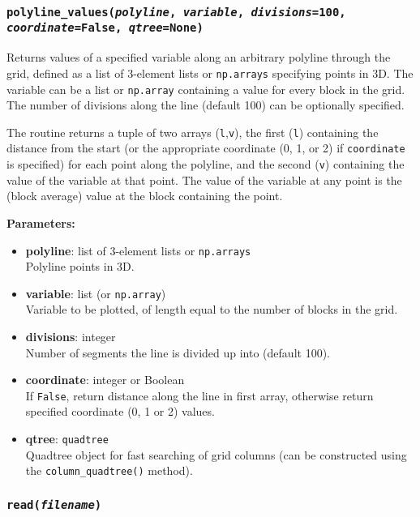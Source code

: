 \subsubsection{\texttt{polyline\_values(\emph{polyline}, \emph{variable}, \emph{divisions}=100, \emph{coordinate}=\texttt{False}, \emph{qtree}=None)}}

Returns values of a specified variable along an arbitrary polyline through the grid, defined as a list of 3-element lists or \texttt{np.arrays} specifying points in 3D.  The variable can be a list or \texttt{np.array} containing a value for every block in the grid.  The number of divisions along the line (default 100) can be optionally specified.

The routine returns a tuple of two arrays (\texttt{l},\texttt{v}), the first (\texttt{l}) containing the distance from the start (or the appropriate coordinate (0, 1, or 2) if \texttt{coordinate} is specified) for each point along the polyline, and the second (\texttt{v}) containing the value of the variable at that point.  The value of the variable at any point is the (block average) value at the block containing the point.

\textbf{Parameters:}
\begin{itemize}
\item \textbf{polyline}: list of 3-element lists or \texttt{np.arrays}\\
  Polyline points in 3D.
\item \textbf{variable}: list (or \texttt{np.array})\\
  Variable to be plotted, of length equal to the number of blocks in the grid.
\item \textbf{divisions}: integer\\
  Number of segments the line is divided up into (default 100).
\item \textbf{coordinate}: integer or Boolean\\
  If \texttt{False}, return distance along the line in first array, otherwise return specified coordinate (0, 1 or 2) values.
\item \textbf{qtree}: \texttt{quadtree}\\
  Quadtree object for fast searching of grid columns (can be constructed using the \texttt{column\_quadtree()} method).
\end{itemize}

\subsubsection{\texttt{read(\emph{filename})}}

